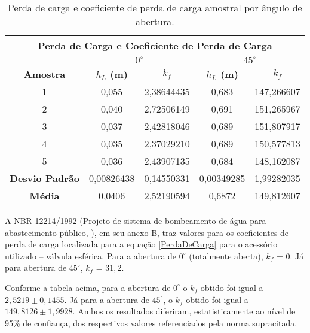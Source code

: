 \begin{table}[H]
\centering
\caption{Perda de carga e coeficiente de perda de carga amostral por ângulo de abertura.}
\label{t:kf}
\begin{tabular}{|c|c|c|c|c|}
\hline
\multicolumn{5}{|c|}{\textbf{Perda de Carga e Coeficiente de Perda de Carga}}                               \\ \hline
\textbf{}              & \multicolumn{2}{c|}{\textbf{$0^\circ$}} & \multicolumn{2}{c|}{\textbf{$45^\circ$}} \\ \hline
\textbf{Amostra}       & \textbf{$h_L$ (m)}   & \textbf{$k_f$}   & \textbf{$h_L$ (m)}    & \textbf{$k_f$}   \\ \hline
1                      & 0,055                & 2,38644435       & 0,683                 & 147,266607       \\ \hline
2                      & 0,040                & 2,72506149       & 0,691                 & 151,265967       \\ \hline
3                      & 0,037                & 2,42818046       & 0,689                 & 151,807917       \\ \hline
4                      & 0,035                & 2,37029210       & 0,689                 & 150,577813       \\ \hline
5                      & 0,036                & 2,43907135       & 0,684                 & 148,162087       \\ \hline
\textbf{Desvio Padrão} & 0,00826438           & 0,14550331       & 0,00349285            & 1,99282035       \\ \hline
\textbf{Média}         & 0,0406               & 2,52190594       & 0,6872                & 149,812607       \\ \hline
\end{tabular}
\end{table}

A NBR 12214/1992 (Projeto de sistema de bombeamento de água para abastecimento
público, \cite{NBR12214}), em seu anexo B, traz valores para os coeficientes de
perda de carga localizada para a equação \eqref{PerdaDeCarga} para o acessório
utilizado -- válvula esférica. Para a abertura de $0^\circ$ (totalmente aberta),
$k_f$ = 0. Já para abertura de $45^\circ$, $k_f$ = $31,2$.

Conforme a tabela acima, para a abertura de $0^\circ$ o $k_f$ obtido foi igual a
$2,5219 \pm 0,1455$. Já para a abertura de $45^\circ$, o $k_f$ obtido foi igual
a $149,8126 \pm 1,9928$. Ambos os resultados diferiram, estatisticamente ao
nível de 95\% de confiança, dos respectivos valores referenciados pela norma
supracitada.

